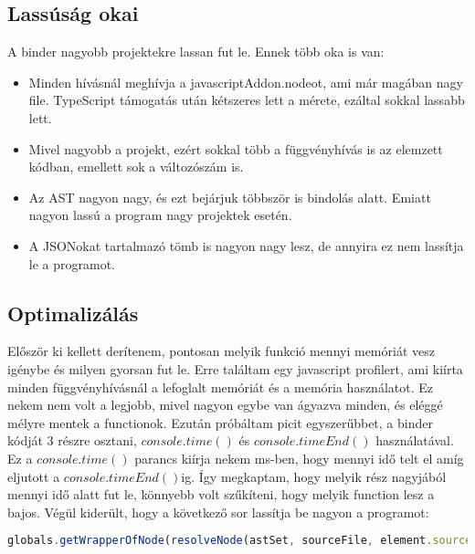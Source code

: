 \subsection{Lassúság okai}

A binder nagyobb projektekre lassan fut le. Ennek több oka is van:

\begin{itemize}
      \item Minden hívásnál meghívja a javascriptAddon.nodeot, ami már magában nagy file. TypeScript támogatás után kétszeres lett a mérete, ezáltal sokkal lassabb lett.
      \item Mivel nagyobb a projekt, ezért sokkal több a függvényhívás is az elemzett kódban, emellett sok a változószám is.
      \item Az AST nagyon nagy, és ezt bejárjuk többször is bindolás alatt. Emiatt nagyon lassú a program nagy projektek esetén.
      \item A JSONokat tartalmazó tömb is nagyon nagy lesz, de annyira ez nem lassítja le a programot.
\end{itemize}

\subsection{Optimalizálás}

\noindent

Először ki kellett derítenem, pontosan melyik funkció mennyi memóriát vesz igénybe és milyen gyorsan fut le.
Erre találtam egy javascript profilert, ami kiírta minden függvényhívásnál a lefoglalt memóriát és a memória használatot.
Ez nekem nem volt a legjobb, mivel nagyon egybe van ágyazva minden, és eléggé mélyre mentek a functionok.
Ezután próbáltam picit egyszerűbbet, a binder kódját 3 részre osztani, ${console.time()}$ és ${console.timeEnd()}$ használatával.
Ez a ${console.time()}$ parancs kiírja nekem ms-ben, hogy mennyi idő telt el amíg eljutott a ${console.timeEnd()}$ig.
Így megkaptam, hogy melyik rész nagyjából mennyi idő alatt fut le, könnyebb volt szűkíteni, hogy melyik function lesz a bajos.
Végül kiderült, hogy a következő sor lassítja be nagyon a programot:

\begin{lstlisting}[caption={Problémás function}, label={lst:binder_problemas_function}, language={JavaScript}]
globals.getWrapperOfNode(resolveNode(astSet, sourceFile, element.source.range.start, element.source.range.end, true));
\end{lstlisting}

